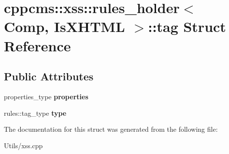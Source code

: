 \hypertarget{structcppcms_1_1xss_1_1rules__holder_1_1tag}{\section{cppcms\-:\-:xss\-:\-:rules\-\_\-holder$<$ Comp, Is\-X\-H\-T\-M\-L $>$\-:\-:tag Struct Reference}
\label{structcppcms_1_1xss_1_1rules__holder_1_1tag}
}
\subsection*{Public Attributes}
\begin{DoxyCompactItemize}
\item 
\hypertarget{structcppcms_1_1xss_1_1rules__holder_1_1tag_a212443664246c9ccc9730b2f9a07a769}{properties\-\_\-type {\bfseries properties}}\label{structcppcms_1_1xss_1_1rules__holder_1_1tag_a212443664246c9ccc9730b2f9a07a769}

\item 
\hypertarget{structcppcms_1_1xss_1_1rules__holder_1_1tag_a19eb13b599393cf7f164660b26c4b45b}{rules\-::tag\-\_\-type {\bfseries type}}\label{structcppcms_1_1xss_1_1rules__holder_1_1tag_a19eb13b599393cf7f164660b26c4b45b}

\end{DoxyCompactItemize}


The documentation for this struct was generated from the following file\-:\begin{DoxyCompactItemize}
\item 
Utils/xss.\-cpp\end{DoxyCompactItemize}
